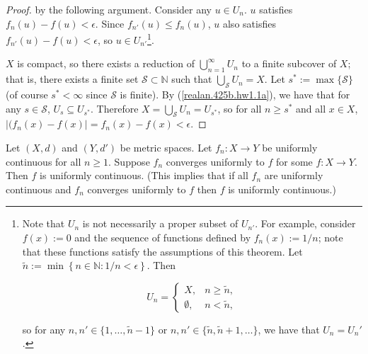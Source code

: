 \begin{proof}
by the following argument. Consider any \(u \in U_n\). \(u\) satisfies \(f_n(u) - f(u) < \epsilon\). Since \(f_{n'}(u) \leq f_n(u)\), \(u\) also satisfies \(f_{n'}(u) - f(u) < \epsilon\), so \(u \in U_{n'}\)\footnote{Note that \(U_n\) is not necessarily a proper subset of \(U_{n'}\). For example, consider \(f(x) := 0\) and the sequence of functions defined by \( f_n(x) := 1/n\); note that these functions satisfy the assumptions of this theorem. Let \(\tilde{n} := \min \left\{n  \in \mathbb{N} : 1/n < \epsilon \right\}\). Then

\[
U_n = \begin{cases}
X, & n \geq \tilde{n}, \\
\emptyset, & n < \tilde{n},
\end{cases}
\]

so for any \(n, n' \in \{1, \ldots, \tilde{n} - 1\}\) or \(n, n' \in \{\tilde{n}, \tilde{n}+1, \ldots\}\), we have that \(U_n = U_n'\).}.

\(X\) is compact, so there exists a reduction of \(\bigcup_{n=1}^\infty U_n\) to a finite subcover of \(X\); that is, there exists a finite set \(\mathcal{S} \subset \mathbb{N}\) such that \(\bigcup_\mathcal{S} U_n = X\). Let \(s^* := \max\{\mathcal{S}\}\) (of course \(s^* < \infty\) since \(\mathcal{S}\) is finite). By (\ref{realan.425b.hw1.1a}), we have that for any \(s \in \mathcal{S}\), \(U_s \subseteq U_{s^*}\). Therefore \(X = \bigcup_\mathcal{S} U_n = U_{s^*}\), so for all \(n \geq s^*\) and all \(x \in X\), \(| (f_n(x) - f(x) | = f_n(x) - f(x)  < \epsilon\).

%



\end{proof}






\begin{proposition}


Let \((X,d)\) and \((Y, d')\) be metric spaces. Let \(f_n: X \to Y\) be uniformly continuous for all \(n \geq 1\). Suppose \(f_n\) converges uniformly to \(f\) for some \(f:X \to Y\). Then \(f\) is uniformly continuous. (This implies that if all \(f_n\) are uniformly continuous and \(f_n\) converges uniformly to \(f\) then \(f\) is uniformly continuous.)

\end{proposition}

